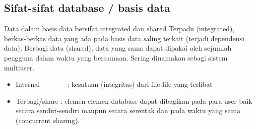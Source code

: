 \subsection{Sifat-sifat database / basis data}
Data dalam basis data bersifat integrated dan shared
Terpadu (integrated), berkas-berkas data yang ada pada basis data saling terkait (terjadi dependensi data);
Berbagi data (shared), data yang sama dapat dipakai oleh sejumlah pengguna dalam waktu yang bersamaan. Sering dinamakan sebagi sistem multiuser.

\noindent 
\begin{itemize}
\item Internal~~~~~~~~:  kesatuan (integritas) dari file-file yang terlibat
\noindent 
\item Terbagi/share : elemen-elemen database dapat dibagikan pada para user baik secara sendiri-sendiri maupun secara serentak dan pada waktu yang sama (concurrent sharing).\end{itemize}
\vspace{12pt}
 
